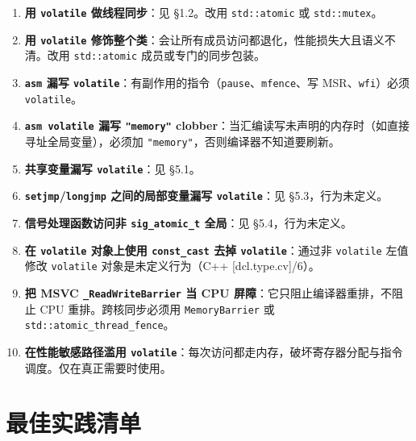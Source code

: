 \documentclass[12pt,a4paper,fontset=fandol]{ctexbook}
\newcommand{\kw}[1]{\texttt{#1}}
\begin{document}
\begin{enumerate}[nosep]
  \item \textbf{用 \kw{volatile} 做线程同步}：见 §1.2。改用 \texttt{std::atomic} 或 \texttt{std::mutex}。
  \item \textbf{用 \kw{volatile} 修饰整个类}：会让所有成员访问都退化，性能损失大且语义不清。改用 \texttt{std::atomic} 成员或专门的同步包装。
  \item \textbf{\texttt{asm} 漏写 \kw{volatile}}：有副作用的指令（\texttt{pause}、\texttt{mfence}、写 MSR、\texttt{wfi}）必须 \kw{volatile}。
  \item \textbf{\texttt{asm volatile} 漏写 \texttt{"memory"} clobber}：当汇编读写未声明的内存时（如直接寻址全局变量），必须加 \texttt{"memory"}，否则编译器不知道要刷新。
  \item \textbf{共享变量漏写 \kw{volatile}}：见 §5.1。
  \item \textbf{\texttt{setjmp}/\allowbreak{}\texttt{longjmp} 之间的局部变量漏写 \kw{volatile}}：见 §5.3，行为未定义。
  \item \textbf{信号处理函数访问非 \texttt{sig\_atomic\_t} 全局}：见 §5.4，行为未定义。
  \item \textbf{在 \kw{volatile} 对象上使用 \texttt{const\_cast} 去掉 \kw{volatile}}：通过非 \kw{volatile} 左值修改 \kw{volatile} 对象是未定义行为（C++ [dcl.type.cv]/6）。
  \item \textbf{把 MSVC \texttt{\_ReadWriteBarrier} 当 CPU 屏障}：它只阻止编译器重排，不阻止 CPU 重排。跨核同步必须用 \texttt{MemoryBarrier} 或 \texttt{std::atomic\_thread\_fence}。
  \item \textbf{在性能敏感路径滥用 \kw{volatile}}：每次访问都走内存，破坏寄存器分配与指令调度。仅在真正需要时使用。
\end{enumerate}

\section{最佳实践清单}\label{sec:best-practices}
\end{document}
